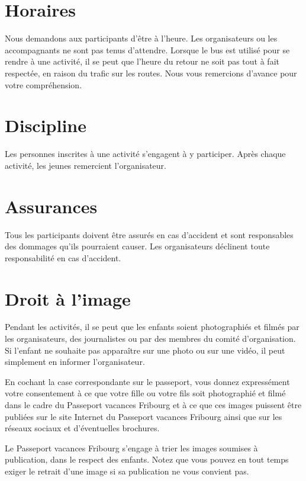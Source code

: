 \section*{Horaires}

Nous demandons aux participants d'être à l'heure. Les organisateurs ou les accompagnants ne sont pas tenus d'attendre.
Lorsque le bus est utilisé pour se rendre à une activité, il se peut que l'heure du retour ne soit pas tout à fait
respectée, en raison du trafic sur les routes. Nous vous remercions d'avance pour votre compréhension.

\section*{Discipline}

Les personnes inscrites à une activité s'engagent à y participer. Après chaque activité, les jeunes remercient
l'organisateur.

\section*{Assurances}

Tous les participants doivent être assurés en cas d'accident et sont responsables des dommages qu'ils pourraient causer.
Les organisateurs déclinent toute responsabilité en cas d'accident.

\section*{Droit à l'image}

Pendant les activités, il se peut que les enfants soient photographiés et filmés par les organisateurs, des journalistes
ou par des membres du comité d'organisation. Si l'enfant ne souhaite pas apparaître sur une photo ou sur une vidéo,
il peut simplement en informer l'organisateur.

En cochant la case correspondante sur le passeport,
vous donnez expressément votre consentement à ce que votre fille ou votre fils soit photographié et filmé dans le cadre du
Passeport vacances Fribourg et à ce que ces images puissent être publiées sur le site Internet du Passeport vacances Fribourg
ainsi que sur les réseaux sociaux et d’éventuelles brochures.

Le Passeport vacances Fribourg s’engage à trier les images soumises à publication, dans le respect des enfants.
Notez que vous pouvez en tout temps exiger le retrait d’une image si sa publication ne vous convient pas.

